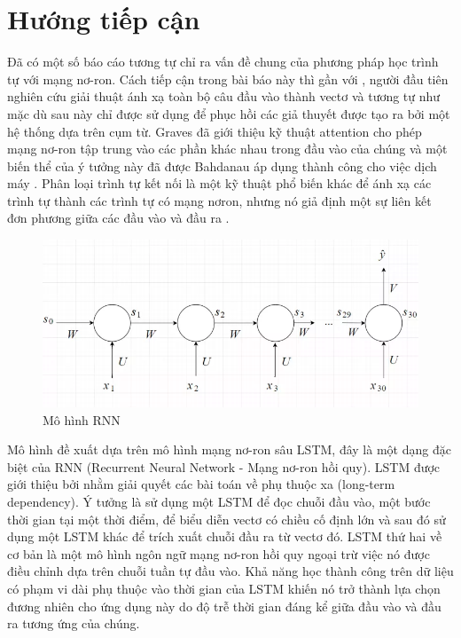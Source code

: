 \section{Hướng tiếp cận}

Đã có một số báo cáo tương tự chỉ ra vấn đề chung của phương pháp học trình tự với mạng nơ-ron. Cách tiếp cận trong bài báo này thì gần với \citep{kalchbrenner2013recurrent}, người đầu tiên nghiên cứu giải thuật ánh xạ toàn bộ câu đầu vào thành vectơ và tương tự như \citep{cho2014learning} mặc dù sau này chỉ được sử dụng để phục hồi các giả thuyết được tạo ra bởi một hệ thống dựa trên cụm từ. Graves \citep{graves2013generating} đã giới thiệu kỹ thuật attention cho phép mạng nơ-ron tập trung vào các phần khác nhau trong đầu vào của chúng và một biến thể của ý tưởng này đã được Bahdanau áp dụng thành công cho việc dịch máy \citep{bahdanau2019neural}. Phân loại trình tự kết nối là một kỹ thuật phổ biến khác để ánh xạ các trình tự thành các trình tự có mạng nơron, nhưng nó giả định một sự liên kết đơn phương giữa các đầu vào và đầu ra \citep{graves2006connectionist}.

\begin{figure}
	\centering
	\includegraphics[scale=0.3]{img/rnn.png}
	\caption{Mô hình RNN}
	\label{rnn}
\end{figure}

Mô hình đề xuất dựa trên mô hình mạng nơ-ron sâu LSTM, đây là một dạng đặc biệt của RNN (Recurrent Neural Network - Mạng nơ-ron hồi quy). LSTM được giới thiệu bởi \citep{HochreiterandSchmidhuber1997} nhằm giải quyết các bài toán về phụ thuộc xa (long-term dependency). Ý tưởng là sử dụng một LSTM để đọc chuỗi đầu vào, một bước thời gian tại một thời điểm, để biểu diễn vectơ có chiều cố định lớn và sau đó sử dụng một LSTM khác để trích xuất chuỗi đầu ra từ vectơ đó. LSTM thứ hai về cơ bản là một mô hình ngôn ngữ mạng nơ-ron hồi quy \citep{Mikolov2010} ngoại trừ việc nó được điều chỉnh dựa trên chuỗi tuần tự đầu vào. Khả năng học thành công trên dữ liệu có phạm vi dài phụ thuộc vào thời gian của LSTM khiến nó trở thành lựa chọn đương nhiên cho ứng dụng này do độ trễ thời gian đáng kể giữa đầu vào và đầu ra tương ứng của chúng.

